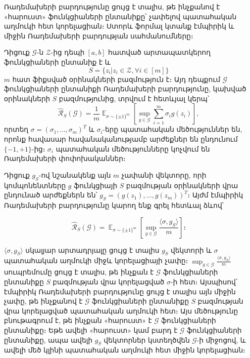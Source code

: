 \documentclass[12pt]{article}
\DeclareMathOperator*{\E}{\mathbb{E}}
\begin{document}
Ռադեմախերի բարդությունը ցույց է տալիս, թե ինչքանով է «հարուստ» ֆունկցիաների ընտանիքը՝ չափելով պատահական աղմուկի հետ կորելացիան։ Ստորև  ֆորմալ կտանք  էմպիրիկ և միջին Ռադեմախերի բարդության սահմանումները։

\begin{defination}
Դիցուք $\mathcal{G}$-ն $\mathcal{Z}$-ից դեպի $[a, b]$ հատված արտապատկերող ֆունկցիաների ընտանիք է և
$$S = \{z_i  | z_i \in \mathcal{Z}, \forall i \in [m]\}$$
$m$ հատ ֆիքսված օրինակների բազմություն է։ Այդ դեպքում $\mathcal{G}$ ֆունկցիաների ընտանիքի Ռադեմախերի բարդությունը, կախված օրինակների $S$ բազմությունից, տրվում է հետևյալ կերպ՝
$$\hat{\mathcal{R}}_S(\mathcal{G})  = \frac{1}{m}\E_{\sigma \sim \{\pm1\}^m} \left [\sup_{g \in \mathcal{G}} \sum_{i=1}^m \sigma_ig(z_i) \right],$$
որտեղ $\sigma = (\sigma_1, ..., \sigma_m)^T$ և $\sigma_i$-երը պատահական մեծություններ են, որոնք հավասար հավանականությամբ արժեքներ են ընդունում $\{-1, +1\}$-ից։ $\sigma_i$ պատահական մեծությունները կոչվում են Ռադեմախերի փոփոխականներ։
\end{defination}

Դիցուք $g_S$-ով նշանակենք այն $m$ չափանի վեկտորը, որի կոմպոնենտները $g$ ֆունկցիայի $S$ բազմության օրինակների վրա ընդունած արժեքներն են՝ $g_S = (g(z_1), ..., g(z_m))^T$։ Այժմ էմպիրիկ Ռադեմախերի բարդությունը կարող ենք գրել հետևալ ձևով՝

$$\hat{\mathcal{R}}_S(\mathcal{G})  = \E  _{\sigma \sim \{ \pm 1\}^m}  \left [  \sup_{g \in \mathcal{G}} \frac{\langle \sigma, g_S \rangle }{m} \right ]։$$

$\langle \sigma, g_S \rangle$ սկալյար արտադրյալը ցույց է տալիս $g_S$ վեկտորի և $\sigma$ պատահական աղմուկի միջև կորելացիայի չափը։ $\sup_{g \in \mathcal{G}}  \frac{\langle \sigma, g_S \rangle}{m}$ սուպրեմումը ցույց է տալիս, թե ինչքան է $\mathcal{G}$ ֆունկցիաների ընտանիքը $S$ բազմության վրա կորելացված $\sigma$-ի հետ։ Այսպիսով՝ էմպիրիկ Ռադեմախերի բարդությունը ցույց է տալիս այն միջին չափը, թե ինչքանով է $\mathcal{G}$ ֆունկցիաների ընտանիքը $S$ բազմության վրա կորելացված պատահական աղմուկի հետ։ Այս մեծությունը բնութագրում է, թե ինչքան «հարուստ» է $\mathcal{G}$ ֆունկցիաների ընտանիքը։ Եթե ավելի «հարուստ» կամ բարդ է $\mathcal{G}$ ֆունկցիաների ընտանիքը, ապա ավելի $g_S$ վեկտորներ կստեղծվեն $\mathcal{G}$-ի միջոցով, և ավելի մեծ կլինի պատահական աղմուկի հետ միջին կորելացիան։
\end{document}

